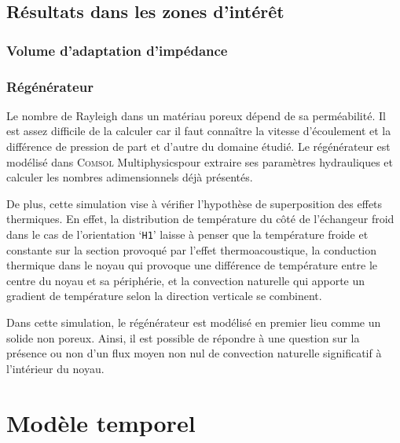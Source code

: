 \subsection{Résultats dans les zones d'intérêt}
\subsubsection{Volume d'adaptation d'impédance}

\subsubsection{Régénérateur}
Le nombre de Rayleigh dans un matériau poreux dépend de sa perméabilité. Il est assez difficile de la calculer car il faut connaître la vitesse d'écoulement et la différence de pression de part et d'autre du domaine étudié. Le régénérateur est modélisé dans \textsc{Comsol} Multiphysics\textss\textregistered pour extraire ses paramètres hydrauliques et calculer les nombres adimensionnels déjà présentés.

De plus, cette simulation vise à vérifier l'hypothèse de superposition des effets thermiques. En effet, la distribution de température du côté de l'échangeur froid dans le cas de l'orientation `\texttt{H1}' laisse à penser que la température froide et constante sur la section provoqué par l'effet thermoacoustique, la conduction thermique dans le noyau qui provoque une différence de température entre le centre du noyau et sa périphérie, et la convection naturelle qui apporte un gradient de température selon la direction verticale se combinent.

Dans cette simulation, le régénérateur est modélisé en premier lieu comme un solide non poreux. Ainsi, il est possible de répondre à une question sur la présence ou non d'un flux moyen non nul de convection naturelle significatif à l'intérieur du noyau.

\section{Modèle temporel} \label{chap:ModeleTemporel}
